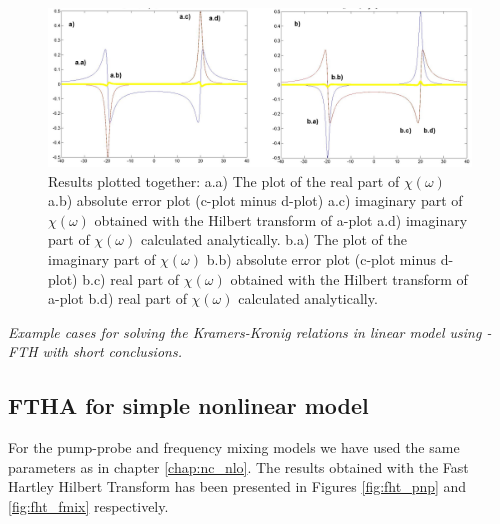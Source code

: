 \documentclass[12pt,twoside,a4paper]{article}
\numberwithin{equation}{subsection}
\numberwithin{figure}{subsection}
\begin{document}
\begin{figure} 
  \includegraphics[width=150mm]{img/fht_lin.png}
  \caption{Results plotted together: 
   a.a) The plot of the real part of $\chi (\omega )$ 
   a.b) absolute error plot (c-plot minus d-plot) 
   a.c) imaginary part of $\chi (\omega )$ obtained with the Hilbert transform of a-plot 
   a.d) imaginary part of $\chi (\omega )$  calculated analytically. 
   b.a) The plot of the imaginary part of $\chi (\omega )$ 
   b.b) absolute error plot (c-plot minus d-plot) 
   b.c) real part of $\chi (\omega )$ obtained with the Hilbert transform of a-plot 
   b.d) real part of $\chi (\omega )$ calculated analytically. \label{fig:fht_lin}
  }
\end{figure}

\textit{Example cases for solving the Kramers-Kronig relations in linear model using  - FTH with short conclusions.}

\subsection{FTHA for simple nonlinear model} \label{chap:hartley_nlo}

For the pump-probe and frequency mixing models we have used the same parameters as in chapter \ref{chap:nc_nlo}. The results
obtained with the Fast Hartley Hilbert Transform has been presented in Figures \ref{fig:fht_pnp} and \ref{fig:fht_fmix}
respectively.
\end{document}
